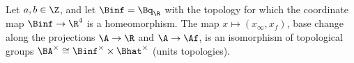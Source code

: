 Let $a,b\in\Z$, and let $\Binf=\Bq_\R$ with the topology for which the coordinate map $\Binf\to\R^4$ is a homeomorphism. The map
$x\mapsto(x_\infty,x_f)$, base change along the projections $\A\to\R$ and $\A\to\Af$, is an isomorphism of topological groups
$\BA^\times\cong\Binf^\times\times\Bhat^\times$ (units topologies).

